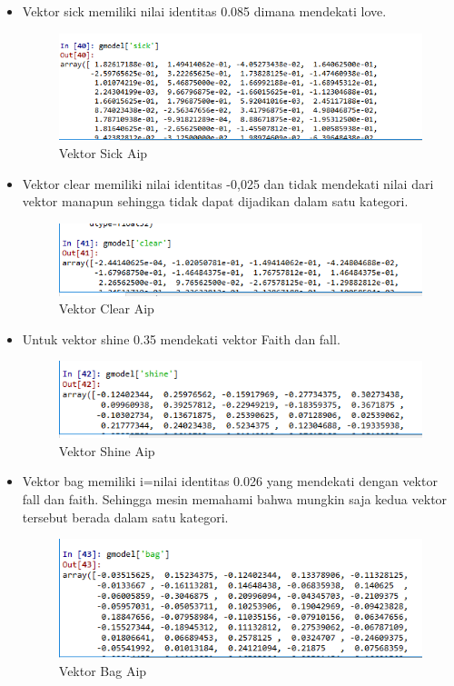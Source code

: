 \begin{itemize}
\item  Vektor sick memiliki nilai identitas 0.085 dimana mendekati love.
\begin{figure}[ht]
\centering
\includegraphics[scale=0.5]{figures/AIP/e7.PNG}
\caption{Vektor Sick Aip}
\label{Praktek}
\end{figure}


\item Vektor clear memiliki nilai identitas -0,025 dan tidak mendekati nilai dari vektor manapun sehingga tidak dapat dijadikan dalam satu kategori.
\begin{figure}[ht]
\centering
\includegraphics[scale=0.3]{figures/AIP/e8.PNG}
\caption{Vektor Clear Aip}
\label{Praktek}
\end{figure}

\item Untuk vektor shine 0.35 mendekati vektor Faith dan fall.
\begin{figure}[ht]
\centering
\includegraphics[scale=0.3]{figures/AIP/e9.PNG}
\caption{Vektor Shine Aip}
\label{Praktek}
\end{figure}


\item Vektor bag memiliki i=nilai identitas 0.026 yang mendekati dengan vektor fall dan faith. Sehingga mesin memahami bahwa mungkin saja kedua vektor tersebut berada dalam satu kategori.
\begin{figure}[ht]
\centering
\includegraphics[scale=0.3]{figures/AIP/e10.PNG}
\caption{Vektor Bag Aip}
\label{Praktek}
\end{figure}



\end{itemize}
